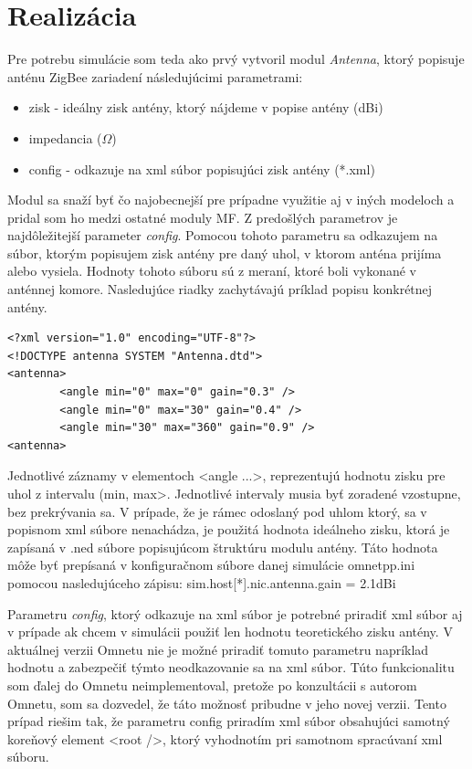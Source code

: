 \documentclass[11pt,twoside,a4paper]{book}
\begin{document}
\chapter{Realizácia}

Pre potrebu simulácie som teda ako prvý vytvoril modul \textit{Antenna}, ktorý popisuje anténu ZigBee zariadení následujúcimi parametrami:
\begin{itemize}
 \item zisk - ideálny zisk antény, ktorý nájdeme v popise antény (dBi)
 \item impedancia ($\Omega$)
 \item config - odkazuje na xml súbor popisujúci zisk antény (*.xml)
\end{itemize}

Modul sa snaží byť čo najobecnejší pre prípadne využitie aj v iných modeloch a pridal som ho medzi ostatné moduly MF. Z predošlých parametrov je najdôležitejší parameter \textit{config}. Pomocou tohoto parametru sa odkazujem na súbor, ktorým popisujem zisk antény pre daný uhol, v ktorom anténa prijíma alebo vysiela. Hodnoty tohoto súboru sú z meraní, ktoré boli vykonané v anténnej komore. Nasledujúce riadky zachytávajú príklad popisu konkrétnej antény. 

\begin{verbatim}
<?xml version="1.0" encoding="UTF-8"?>
<!DOCTYPE antenna SYSTEM "Antenna.dtd">
<antenna>
        <angle min="0" max="0" gain="0.3" />
        <angle min="0" max="30" gain="0.4" />
        <angle min="30" max="360" gain="0.9" />
<antenna>
\end{verbatim}

Jednotlivé záznamy v elementoch <angle ...>, reprezentujú hodnotu zisku pre uhol z intervalu (min, max>. Jednotlivé intervaly musia byť zoradené vzostupne, bez prekrývania sa. V prípade, že je rámec odoslaný pod uhlom ktorý, sa v popisnom xml súbore nenachádza, je použitá  hodnota ideálneho zisku, ktorá je zapísaná v .ned súbore popisujúcom štruktúru modulu antény. Táto hodnota môže byť prepísaná v konfiguračnom súbore danej simulácie omnetpp.ini pomocou nasledujúceho zápisu: 
sim.host[*].nic.antenna.gain = 2.1dBi

Parametru \textit{config}, ktorý odkazuje na xml súbor je potrebné priradiť xml súbor aj v prípade ak chcem v simulácii použiť len hodnotu teoretického zisku antény. V aktuálnej verzii Omnetu nie je možné priradiť tomuto parametru napríklad hodnotu  a zabezpečiť týmto neodkazovanie sa na xml súbor. Túto funkcionalitu som ďalej do Omnetu neimplementoval, pretože po konzultácii s autorom Omnetu, som sa dozvedel, že táto možnosť pribudne v jeho novej verzii. Tento prípad riešim tak, že parametru config priradím xml súbor obsahujúci samotný koreňový element <root />, ktorý vyhodnotím pri samotnom spracúvaní xml súboru.
\end{document}
